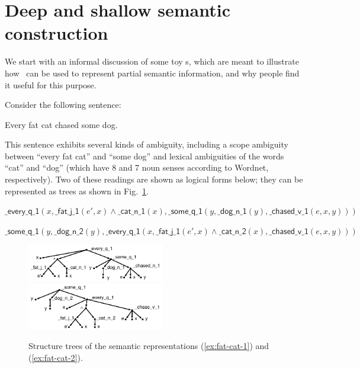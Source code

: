 \section{Deep and shallow semantic construction}
\label{sec:motivation}

We start with an informal discussion of some toy \rmrs s, which are
meant to illustrate how \rmrs\ can be used to represent partial
semantic information, and why people find it useful for this purpose.

\newcommand{\sem}[1]{\mathsf{#1}}
\newcommand{\sempred}[1]{\mathrm{#1}}

Consider the following sentence:
\begin{examples}
  \item Every fat cat chased some dog.
\end{examples}

This sentence exhibits several kinds of ambiguity, including a scope
ambiguity between ``every fat cat'' and ``some dog'' and lexical
ambiguities of the words ``cat'' and ``dog'' (which have 8 and 7 noun
senses according to Wordnet, respectively).  Two of these readings are
shown as logical forms below; they can be represented as trees as
shown in Fig.~\ref{fig:1}.

\begin{examples}
\item $\sem{\_every\_q\_1}(x, \sem{\_fat\_j\_1}(e',x) \wedge
    \sem{\_cat\_n\_1}(x), \sem{\_some\_q\_1}(y, \sem{\_dog\_n\_1}(y),
    \sem{\_chased\_v\_1}(e,x,y)))$
\label{ex:fat-cat-1}
\item $\sem{\_some\_q\_1}(y, \sem{\_dog\_n\_2}(y),
\sem{\_every\_q\_1}(x, \sem{\_fat\_j\_1}(e',x) \wedge
    \sem{\_cat\_n\_2}(x), 
    \sem{\_chased\_v\_1}(e,x,y)))$
\label{ex:fat-cat-2}
\end{examples}


\begin{figure}[t]
\includegraphics[width=6cm]{pic-cat-chased-dog}
\hspace{1cm}
\includegraphics[width=6cm]{pic-cat-chased-dog-2}
\caption{Structure trees of the semantic representations (\ref{ex:fat-cat-1}) and
  (\ref{ex:fat-cat-2}). \label{fig:1}}
\end{figure}


